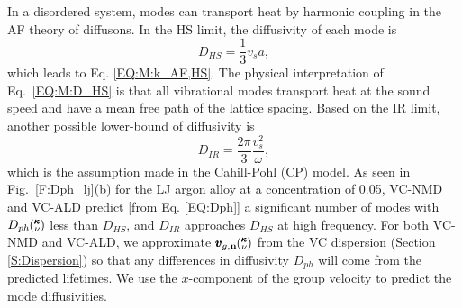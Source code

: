 \documentclass[aps,prb,onecolumn,preprint,footinbib,superscriptaddress,amsmath,amssymb,floatfix]{revtex4}
\newcommand{\kv}{\mspace{-4.0mu}\left(\mspace{-8.0mu}
\begin{smallmatrix}&\pmb{\kappa} \\&\nu\end{smallmatrix}
\mspace{-3.0mu}\right)}
\begin{document}
In a disordered system,  
modes can transport heat by harmonic coupling in the AF theory of 
diffusons.\cite{allen_thermal_1993} In the HS limit,
\cite{cahill_lattice_1988} 
the diffusivity of each mode is
\begin{equation}\label{EQ:M:D_HS}
D_{HS} = \frac{1}{3} v_s a,
\end{equation}
which leads to Eq. \eqref{EQ:M:k_AF,HS}.\cite{vc_fn3_2013} 
The physical interpretation of Eq.~\eqref{EQ:M:D_HS} 
is that all vibrational modes transport heat at the sound speed 
and have a mean free path of the lattice spacing. 
Based on the IR limit, another possible lower-bound of 
diffusivity is  
\begin{equation}\label{EQ:M:D_IR}
D_{IR} = \frac{2\pi}{3} \frac{v^2_s}{\omega}, 
\end{equation}
which is the assumption made in the Cahill-Pohl (CP) model.
\cite{cahill_lattice_1988} 
As seen in Fig.~\ref{F:Dph_lj}(b) for the LJ argon alloy at 
a concentration of 0.05, VC-NMD and VC-ALD predict [from 
Eq. \eqref{EQ:Dph}] a significant number of modes with  
$D_{ph}\kv$ less than $D_{HS}$, and $D_{IR}$ approaches $D_{HS}$ at 
high frequency. For both VC-NMD and VC-ALD, we 
approximate $\pmb{v}_{g,\mathbf{n}}\kv$ from the VC dispersion 
(Section \ref{S:Dispersion}) so that any differences in 
diffusivity $D_{ph}$ will come from the predicted lifetimes. We use 
the $x$-component of the group velocity to predict the mode 
diffusivities. 
\end{document}
